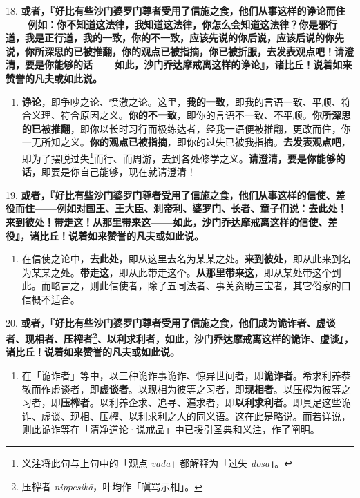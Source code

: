 {\Large 18.} \textbf{或者，『好比有些沙门婆罗门尊者受用了信施之食，他们从事这样的诤论而住——例如：你不知道这法律，我知道这法律，你怎么会知道这法律？你是邪行道，我是正行道，我的一致，你的不一致，应该先说的你后说，应该后说的你先说，你所深思的已被推翻，你的观点已被指摘，你已被折服，去发表观点吧！请澄清，要是你能够的话——如此，沙门乔达摩戒离这样的诤论』，诸比丘！说着如来赞誉的凡夫或如此说。}

\begin{enumerate}\item \textbf{诤论}，即争吵之论、愤激之论。这里，\textbf{我的一致}，即我的言语一致、平顺、符合义理、符合原因之义。\textbf{你的不一致}，即你的言语不一致、不平顺。\textbf{你所深思的已被推翻}，即你以长时习行而极练达者，经我一语便被推翻，更改而住，你一无所知之义。\textbf{你的观点已被指摘}，即你的过失已被我指摘。\textbf{去发表观点吧}，即为了摆脱过失\footnote{义注将此句与上句中的「观点 \textit{vāda}」都解释为「过失 \textit{dosa}」。}而行、而周游，去到各处修学之义。\textbf{请澄清，要是你能够的话}，即要是你自己能够，现在就请澄清！\end{enumerate}

{\Large 19.} \textbf{或者，『好比有些沙门婆罗门尊者受用了信施之食，他们从事这样的信使、差役而住——例如对国王、王大臣、刹帝利、婆罗门、长者、童子们说：去此处！来到彼处！带走这！从那里带来这——如此，沙门乔达摩戒离这样的信使、差役』，诸比丘！说着如来赞誉的凡夫或如此说。}

\begin{enumerate}\item 在信使之论中，\textbf{去此处}，即从这里去名为某某之处。\textbf{来到彼处}，即从此来到名为某某之处。\textbf{带走这}，即从此带走这个。\textbf{从那里带来这}，即从某处带这个到此。而略言之，则此信使者，除了五同法者、事关资助三宝者，其它俗家的口信概不适合。\end{enumerate}

{\Large 20.} \textbf{或者，『好比有些沙门婆罗门尊者受用了信施之食，他们成为诡诈者、虚谈者、现相者、压榨者\footnote{压榨者 \textit{nippesikā}，叶均作「嗔骂示相」。}、以利求利者，如此，沙门乔达摩戒离这样的诡诈、虚谈』，诸比丘！说着如来赞誉的凡夫或如此说。}

\begin{enumerate}\item 在「诡诈者」等中，以三种诡诈事诡诈、惊异世间者，即\textbf{诡诈者}。希求利养恭敬而作虚谈者，即\textbf{虚谈者}。以现相为彼等之习者，即\textbf{现相者}。以压榨为彼等之习者，即\textbf{压榨者}。以利养企求、追寻、遍求者，即\textbf{以利求利者}。即具足这些诡诈、虚谈、现相、压榨、以利求利之人的同义语。这在此是略说。而若详说，则此诡诈等在「清净道论·说戒品」中已援引圣典和义注，作了阐明。\end{enumerate}

